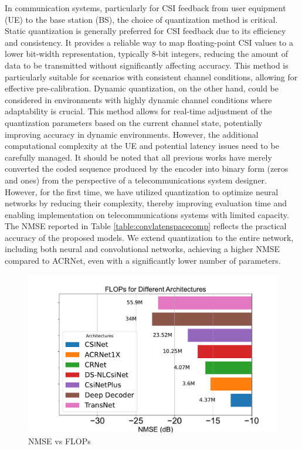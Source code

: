 \documentclass[lettersize,journal]{IEEEtran}
\begin{document}
In communication systems, particularly for CSI feedback from user equipment (UE) to the base station (BS), the choice of quantization method is critical. Static quantization is generally preferred for CSI feedback due to its efficiency and consistency. It provides a reliable way to map floating-point CSI values to a lower bit-width representation, typically 8-bit integers, reducing the amount of data to be transmitted without significantly affecting accuracy. This method is particularly suitable for scenarios with consistent channel conditions, allowing for effective pre-calibration.
Dynamic quantization, on the other hand, could be considered in environments with highly dynamic channel conditions where adaptability is crucial. This method allows for real-time adjustment of the quantization parameters based on the current channel state, potentially improving accuracy in dynamic environments. However, the additional computational complexity at the UE and potential latency issues need to be carefully managed.
It should be noted that all previous works have merely converted the coded sequence produced by the encoder into binary form (zeros and ones) from the perspective of a telecommunications system designer. However, for the first time, we have utilized quantization to optimize neural networks by reducing their complexity, thereby improving evaluation time and enabling implementation on telecommunications systems with limited capacity.
The NMSE reported in Table \ref{table:convlatenspacecomp} reflects the practical accuracy of the proposed models. We extend quantization to the entire network, including both neural and convolutional networks, achieving a higher NMSE compared to ACRNet, even with a significantly lower number of parameters.

\begin{figure}[!t]
	
	\begin{minipage}[b]{0.4\textwidth}
		\centering
		\includegraphics[width=\textwidth]{NMSEvsFLOPs.pdf}
		\caption{NMSE vs FLOPs}
		\label{fig:nmse-flops}
	\end{minipage}
\end{figure}
\end{document}
